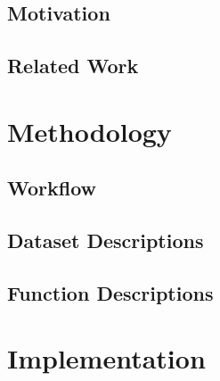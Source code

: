 \documentclass[12pt]{article}
\begin{document}
\iffalse In this file, we present some tips and sample mark-up to assure your
\LaTeX\ file of the smoothest possible journey from review manuscript
to published {\it Science\/} paper.  We focus here particularly on
issues related to style files, citation, and math, tables, and
figures, as those tend to be the biggest sticking points.  Please use
the source file for this document, \texttt{scifile.tex}, as a template
for your manuscript, cutting and pasting your content into the file at
the appropriate places.

{\it Science\/}'s publication workflow relies on Microsoft Word97.  To
translate \LaTeX\ files into Word97, we use an intermediate MS-DOS
routine \cite{tth} that converts the \TeX\ source into HTML\@.  The
routine is generally robust, but it works best if the source document
is clean \LaTeX\ without a significant freight of local macros or
\texttt{.sty} files.  Use of the source file \texttt{scifile.tex} as a
template, and calling {\it only\/} the \texttt{.sty} and \texttt{.bst}
files specifically mentioned here, will generate a manuscript that
should be eminently reviewable, and yet will allow your paper to
proceed quickly into our production flow upon acceptance \cite{use2e}.
\fi

\subsection{Motivation}

\subsection{Related Work}

\section{Methodology}

\subsection{Workflow}
\subsection{Dataset Descriptions}
\subsection{Function Descriptions}


\section{Implementation}
\end{document}
